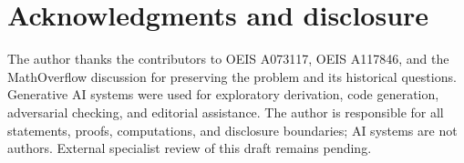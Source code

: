 \section*{Acknowledgments and disclosure}
The author thanks the contributors to OEIS A073117, OEIS A117846, and the MathOverflow discussion for preserving the problem and its historical questions. Generative AI systems were used for exploratory derivation, code generation, adversarial checking, and editorial assistance. The author is responsible for all statements, proofs, computations, and disclosure boundaries; AI systems are not authors. External specialist review of this draft remains pending.

